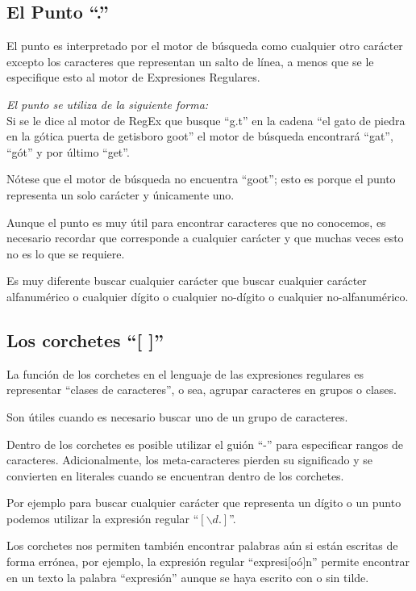 \subsection{El Punto ``.''}

El punto es interpretado por el motor de búsqueda como cualquier otro carácter
excepto los caracteres que representan un salto de línea,
a menos que se le especifique esto al motor de Expresiones Regulares.

\emph{El punto se utiliza de la siguiente forma:}\\
Si se le dice al motor de RegEx que busque ``g.t'' en la cadena ``el gato de piedra en la gótica puerta de getisboro goot''
el motor de búsqueda encontrará ``gat'', ``gót'' y por último ``get''.

Nótese que el motor de búsqueda no encuentra ``goot''; esto es porque el punto representa un solo carácter y únicamente uno.

Aunque el punto es muy útil para encontrar caracteres que no conocemos,
es necesario recordar que corresponde a cualquier carácter y que muchas veces esto no es lo que se requiere.

Es muy diferente buscar cualquier carácter que buscar cualquier carácter alfanumérico
o cualquier dígito o cualquier no-dígito o cualquier no-alfanumérico.

\subsection{Los corchetes ``[ ]''}

La función de los corchetes en el lenguaje de las expresiones regulares es representar
``clases de caracteres'',
o sea,
agrupar caracteres en grupos o clases.

Son útiles cuando es necesario buscar uno de un grupo de caracteres.

Dentro de los corchetes es posible utilizar el guión ``-'' para especificar rangos de caracteres.
Adicionalmente,
los meta-caracteres pierden su significado y se convierten en literales cuando se encuentran dentro de los corchetes.

Por ejemplo para buscar cualquier carácter que representa un dígito
o un punto podemos utilizar la expresión regular ``$[\backslash d.]$''.

Los corchetes nos permiten también encontrar palabras aún si están escritas de forma errónea,
por ejemplo,
la expresión regular ``expresi$[$oó$]$n'' permite encontrar en un texto la palabra ``expresión'' aunque se haya escrito con o sin tilde.

